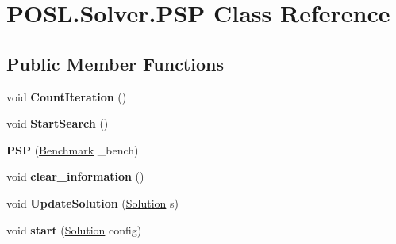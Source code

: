 \hypertarget{classPOSL_1_1Solver_1_1PSP}{}\section{P\+O\+S\+L.\+Solver.\+P\+SP Class Reference}
\label{classPOSL_1_1Solver_1_1PSP}
\subsection*{Public Member Functions}
\begin{DoxyCompactItemize}
\item 
\mbox{\label{classPOSL_1_1Solver_1_1PSP_a8872ef349843c33c1c4f13b0b2878130}} 
void {\bfseries Count\+Iteration} ()
\item 
\mbox{\label{classPOSL_1_1Solver_1_1PSP_a0c9b08935ba5e6cca5b928540cb7b23a}} 
void {\bfseries Start\+Search} ()
\item 
\mbox{\label{classPOSL_1_1Solver_1_1PSP_a4c954c786f33f716b404e67ada4c2dc0}} 
{\bfseries P\+SP} (\hyperlink{classPOSL_1_1Benchmarks_1_1Benchmark}{Benchmark} \+\_\+bench)
\item 
\mbox{\label{classPOSL_1_1Solver_1_1PSP_a74a8b55d86cf8bcd6a514d1b8cd46a70}} 
void {\bfseries clear\+\_\+information} ()
\item 
\mbox{\label{classPOSL_1_1Solver_1_1PSP_ad8e69c9dfc1f9cd0c5b5f74003596ebb}} 
void {\bfseries Update\+Solution} (\hyperlink{classPOSL_1_1Data_1_1Solution}{Solution} s)
\item 
\mbox{\label{classPOSL_1_1Solver_1_1PSP_a4d13f879836df5527104668c68f0ca43}} 
void {\bfseries start} (\hyperlink{classPOSL_1_1Data_1_1Solution}{Solution} config)
\end{DoxyCompactItemize}
